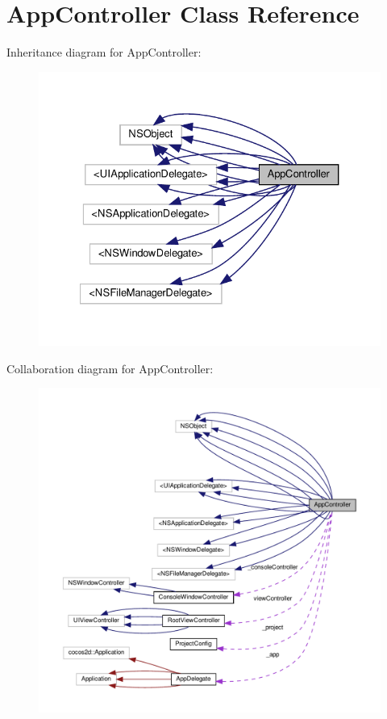 \hypertarget{interfaceAppController}{}\section{App\+Controller Class Reference}
\label{interfaceAppController}


Inheritance diagram for App\+Controller\+:
\nopagebreak
\begin{figure}[H]
\begin{center}
\leavevmode
\includegraphics[width=327pt]{interfaceAppController__inherit__graph}
\end{center}
\end{figure}


Collaboration diagram for App\+Controller\+:
\nopagebreak
\begin{figure}[H]
\begin{center}
\leavevmode
\includegraphics[width=350pt]{interfaceAppController__coll__graph}
\end{center}
\end{figure}
